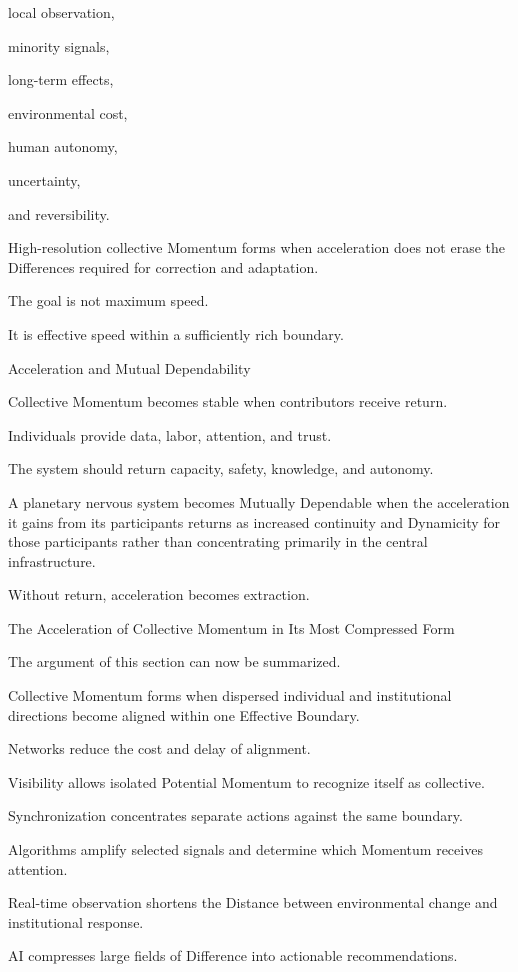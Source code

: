local observation,

minority signals,

long-term effects,

environmental cost,

human autonomy,

uncertainty,

and reversibility.

High-resolution collective Momentum forms when acceleration does not erase the Differences required for correction and adaptation.

The goal is not maximum speed.

It is effective speed within a sufficiently rich boundary.

Acceleration and Mutual Dependability

Collective Momentum becomes stable when contributors receive return.

Individuals provide data, labor, attention, and trust.

The system should return capacity, safety, knowledge, and autonomy.

A planetary nervous system becomes Mutually Dependable when the acceleration it gains from its participants returns as increased continuity and Dynamicity for those participants rather than concentrating primarily in the central infrastructure.

Without return, acceleration becomes extraction.

The Acceleration of Collective Momentum in Its Most Compressed Form

The argument of this section can now be summarized.

Collective Momentum forms when dispersed individual and institutional directions become aligned within one Effective Boundary.

Networks reduce the cost and delay of alignment.

Visibility allows isolated Potential Momentum to recognize itself as collective.

Synchronization concentrates separate actions against the same boundary.

Algorithms amplify selected signals and determine which Momentum receives attention.

Real-time observation shortens the Distance between environmental change and institutional response.

AI compresses large fields of Difference into actionable recommendations.

